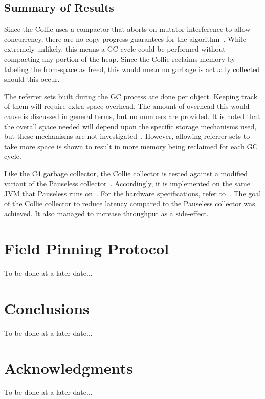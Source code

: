 \documentclass{sig-alternate}
\begin{document}
\subsection{Summary of Results}
\label{sec:collieResults}

Since the Collie uses a compactor that aborts on mutator interference to allow
concurrency, there are no copy-progress guarantees for the algorithm~\cite{Osterlund:FPP}.
While extremely unlikely, this means a GC cycle could be performed without compacting
any portion of the heap. Since the Collie reclaims memory by labeling the from-space as freed,
this would mean no garbage is actually collected should this occur.

The referrer sets built during the GC process are done per object. Keeping track of them
will require extra space overhead. The amount of overhead this would cause is discussed in
general terms, but no numbers are provided. It is noted that the overall space needed will 
depend upon the specific storage mechanisms used, but these mechanisms are not 
investigated~\cite{Iyengar:Collie}. However, allowing referrer sets to take
more space is shown to result in more memory being reclaimed for each GC cycle.

Like the C4 garbage collector, the Collie collector is tested against a modified
variant of the Pauseless collector~\cite{Iyengar:Collie}. Accordingly, it is 
implemented on the same JVM that Pauseless runs on~\cite{Click:Pauseless}. For the 
hardware specifications, refer to~\cite{Iyengar:Collie}. The goal of the Collie 
collector to reduce latency compared to the Pauseless collector was achieved. 
It also managed to increase throughput as a side-effect. 



\section{Field Pinning Protocol}
\label{sec:fpp}

To be done at a later date...


\section{Conclusions}
\label{sec:conclusions}

To be done at a later date...


\section*{Acknowledgments}
\label{sec:acknowledgments}

To be done at a later date...



  
\end{document}
